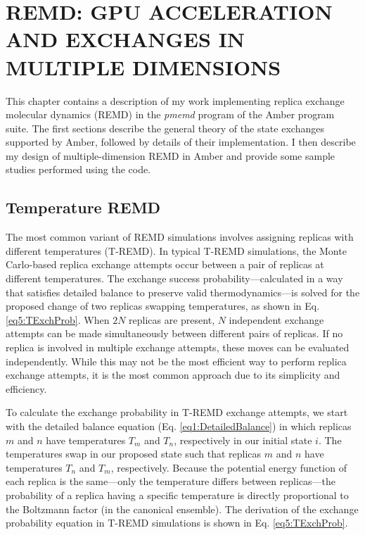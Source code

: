\chapter{REMD: GPU ACCELERATION AND EXCHANGES IN MULTIPLE DIMENSIONS}
\label{ch5}

This chapter contains a description of my work implementing replica exchange
molecular dynamics (REMD) in the \emph{pmemd} program of the Amber program
suite. \cite{AMBER12} The first sections describe the general theory of the
state exchanges supported by Amber, followed by details of their implementation.
I then describe my design of multiple-dimension REMD in Amber and provide some
sample studies performed using the code.

\section{Temperature REMD}

The most common variant of REMD simulations involves assigning replicas with
different temperatures (T-REMD). \cite{Sugita_ChemPhysLett_1999_v314_p141} In
typical T-REMD simulations, the Monte Carlo-based replica exchange attempts
occur between a pair of replicas at different temperatures. The exchange success
probability---calculated in a way that satisfies detailed balance to preserve
valid thermodynamics---is solved for the proposed change of two replicas
swapping temperatures, as shown in Eq. \ref{eq5:TExchProb}.  When $2N$ replicas
are present, $N$ independent exchange attempts can be made simultaneously
between different pairs of replicas. If no replica is involved in multiple
exchange attempts, these moves can be evaluated independently. While this may
not be the most efficient way to perform replica exchange attempts, it is the
most common approach due to its simplicity and efficiency.

To calculate the exchange probability in T-REMD exchange attempts, we start with
the detailed balance equation (Eq. \ref{eq1:DetailedBalance}) in which replicas
$m$ and $n$ have temperatures $T_m$ and $T_n$, respectively in our initial state
$i$. The temperatures swap in our proposed state such that replicas $m$ and $n$
have temperatures $T_n$ and $T_m$, respectively. Because the potential energy
function of each replica is the same---only the temperature differs between
replicas---the probability of a replica having a specific temperature is
directly proportional to the Boltzmann factor (in the canonical ensemble). The
derivation of the exchange probability equation in T-REMD simulations is shown
in Eq. \ref{eq5:TExchProb}.

